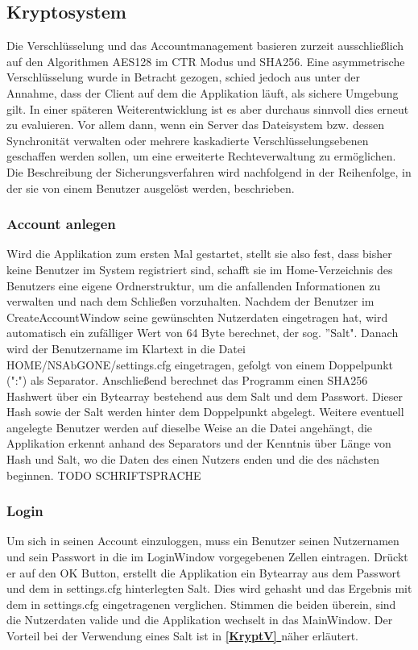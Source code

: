 \documentclass[13pt,a4paper,bibliography=totocnumbered,listof=totocnumbered]{scrartcl}
\newcommand*{\fullref}[1]{\textbf{\hyperref[{#1}]{\ref*{#1} \nameref*{#1}}}}
\begin{document}
\subsection{Kryptosystem}
Die Verschlüsselung und das Accountmanagement basieren zurzeit ausschließlich auf den Algorithmen AES128 im CTR Modus und SHA256. Eine asymmetrische Verschlüsselung wurde in Betracht gezogen, schied jedoch aus unter der Annahme, dass der Client auf dem die Applikation läuft, als sichere Umgebung gilt. In einer späteren Weiterentwicklung ist es aber durchaus sinnvoll dies erneut zu evaluieren. Vor allem dann, wenn ein Server das Dateisystem bzw. dessen Synchronität verwalten oder mehrere kaskadierte Verschlüsselungsebenen geschaffen werden sollen, um eine erweiterte Rechteverwaltung zu ermöglichen. Die Beschreibung der Sicherungsverfahren wird nachfolgend in der Reihenfolge, in der sie von einem Benutzer ausgelöst werden, beschrieben.
\subsubsection{Account anlegen}
Wird die Applikation zum ersten Mal gestartet, stellt sie also fest, dass bisher keine Benutzer im System registriert sind, schafft sie im Home-Verzeichnis des Benutzers eine eigene Ordnerstruktur, um die anfallenden Informationen zu verwalten und nach dem Schließen vorzuhalten. Nachdem der Benutzer im CreateAccountWindow seine gewünschten Nutzerdaten eingetragen hat, wird automatisch ein zufälliger Wert von 64 Byte berechnet, der sog. ''Salt". Danach wird der Benutzername im Klartext in die Datei HOME/NSAbGONE/settings.cfg eingetragen, gefolgt von einem Doppelpunkt (":") als Separator. Anschließend berechnet das Programm einen SHA256 Hashwert über ein Bytearray bestehend aus dem Salt und dem Passwort. Dieser Hash sowie der Salt werden hinter dem Doppelpunkt abgelegt. Weitere eventuell angelegte Benutzer werden auf dieselbe Weise an die Datei angehängt, die Applikation erkennt anhand des Separators und der Kenntnis über Länge von Hash und Salt, wo die Daten des einen Nutzers enden und die des nächsten beginnen. TODO SCHRIFTSPRACHE
\subsubsection{Login}
Um sich in seinen Account einzuloggen, muss ein Benutzer seinen Nutzernamen und sein Passwort in die im LoginWindow vorgegebenen Zellen eintragen. Drückt er auf den OK Button, erstellt die Applikation ein Bytearray aus dem Passwort und dem in settings.cfg hinterlegten Salt. Dies wird gehasht und das Ergebnis mit dem in settings.cfg eingetragenen verglichen. Stimmen die beiden überein, sind die Nutzerdaten valide und die Applikation wechselt in das MainWindow. Der Vorteil bei der Verwendung eines Salt ist in \fullref{KryptV} näher erläutert.
\end{document}
